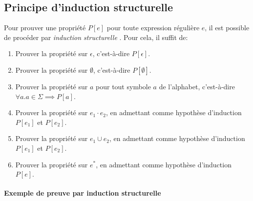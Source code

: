 
\subsection{Principe d'induction structurelle}

Pour prouver une propriété $P[e]$ pour toute expression régulière $e$, il est possible de procéder par \og \textit{induction structurelle} \fg{}. Pour cela, il suffit de:
\begin{enumerate}
\item Prouver la propriété sur $\epsilon$, c'est-à-dire $P[\epsilon]$.
\item Prouver la propriété sur $\emptyset$, c'est-à-dire $P[\emptyset]$.
\item Prouver la propriété sur $a$ pour tout symbole $a$ de l'alphabet,  c'est-à-dire $\forall a. a \in \Sigma \implies P[a]$.
\item Prouver la propriété sur $e_1 \cdot e_2$, en admettant comme hypothèse d'induction $P[e_1]$ et $P[e_2]$.
\item Prouver la propriété sur $e_1 \cup e_2$, en admettant comme hypothèse d'induction $P[e_1]$ et $P[e_2]$.
\item Prouver la propriété sur $e^*$, en admettant comme hypothèse d'induction $P[e]$.
\end{enumerate}

\paragraph{Exemple de preuve par induction structurelle}

